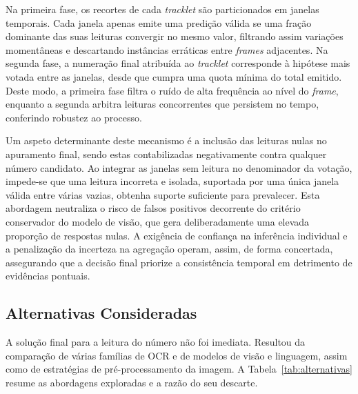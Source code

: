 Na primeira fase, os recortes de cada \emph{tracklet} são particionados em janelas temporais.
Cada janela apenas emite uma predição válida se uma fração dominante das suas leituras convergir
no mesmo valor, filtrando assim variações momentâneas e descartando instâncias erráticas entre
\emph{frames} adjacentes. Na segunda fase, a numeração final atribuída ao \emph{tracklet}
corresponde à hipótese mais votada entre as janelas, desde que cumpra uma quota mínima do total
emitido. Deste modo, a primeira fase filtra o ruído de alta frequência ao nível do \emph{frame},
enquanto a segunda arbitra leituras concorrentes que persistem no tempo, conferindo robustez ao
processo.

Um aspeto determinante deste mecanismo é a inclusão das leituras nulas no apuramento final, sendo
estas contabilizadas negativamente contra qualquer número candidato. Ao integrar as janelas sem
leitura no denominador da votação, impede-se que uma leitura incorreta e isolada, suportada por
uma única janela válida entre várias vazias, obtenha suporte suficiente para prevalecer. Esta
abordagem neutraliza o risco de falsos positivos decorrente do critério conservador do modelo de
visão, que gera deliberadamente uma elevada proporção de respostas nulas. A exigência de confiança
na inferência individual e a penalização da incerteza na agregação operam, assim, de forma
concertada, assegurando que a decisão final priorize a consistência temporal em detrimento de
evidências pontuais.

\subsection{Alternativas Consideradas}

A solução final para a leitura do número não foi imediata. Resultou da comparação de várias famílias
de OCR e de modelos de visão e linguagem, assim como de estratégias de pré-processamento da imagem.
A Tabela~\ref{tab:alternativas} resume as abordagens exploradas e a razão do seu descarte.

